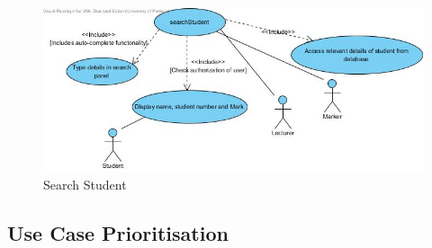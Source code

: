 \documentclass[a4paper]{article}
\begin{document}
			\begin{figure}[H]
				\centering
				\includegraphics[width=1\textwidth]{searchStudent}
				\caption{Search Student}
			\end{figure}

		\subsection{Use Case Prioritisation}
\end{document}
